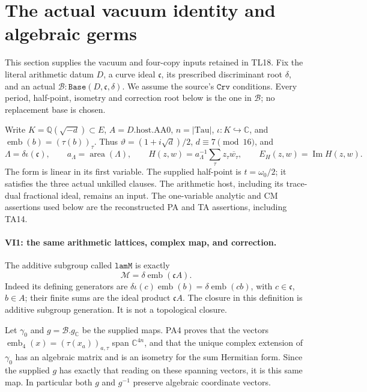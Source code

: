 \section{The actual vacuum identity and algebraic germs}
\label{sec:vacuum-identity}

This section supplies the vacuum and four-copy inputs retained in
TL18. Fix the literal arithmetic datum \(D\), a curve ideal
\(\mathfrak c\), its prescribed discriminant root \(\delta\), and
an actual \(\mathscr B:\texttt{Base}(D,\mathfrak c,\delta)\).
We assume the source's \(\texttt{Crv}\) conditions. Every period,
half-point, isometry and correction root below is the one in
\(\mathscr B\); no replacement base is chosen.

Write \(K=\mathbb Q(\sqrt{-d})\subset E\), \(A=D.\mathrm{host}.\mathrm{AA0}\),
\(n=|\mathrm{Tau}|\), \(\iota:K\hookrightarrow\mathbb C\), and
\(\operatorname{emb}(b)=(\tau(b))_\tau\). Thus
\(\vartheta=(1+i\sqrt d)/2\), \(d\equiv7\pmod {16}\), and
\[
 \Lambda=\delta\iota(\mathfrak c),\qquad
 a_\Lambda=\operatorname{area}(\Lambda),\qquad
 H(z,w)=a_\Lambda^{-1}\sum_\tau z_\tau\overline{w_\tau},
 \qquad E_H(z,w)=\operatorname{Im}H(z,w).
 \tag{VI.1}
\]
The form is linear in its first variable. The supplied half-point is
\(t=\omega_0/2\); it satisfies the three actual unkilled clauses.
The arithmetic host, including its trace-dual fractional ideal, remains
an input. The one-variable analytic and CM assertions used below are
the reconstructed PA and TA assertions, including TA14.

\paragraph{VI1: the same arithmetic lattices, complex map, and correction.}
The additive subgroup called \(\texttt{lamM}\) is exactly
\[
             \mathcal M=\delta\operatorname{emb}(\mathfrak c A).
 \tag{VI1.1}
\]
Indeed its defining generators are
\(\delta\iota(c)\operatorname{emb}(b)=
\delta\operatorname{emb}(cb)\), with \(c\in\mathfrak c\),
\(b\in A\); their finite sums are the ideal product
\(\mathfrak c A\). The closure in this definition is additive
subgroup generation. It is not a topological closure.

Let \(\gamma_0\) and \(g=\mathscr B.g_{\mathbb C}\) be the supplied
maps. PA4 proves that the vectors
\(\operatorname{emb}_4(x)=(\tau(x_a))_{a,\tau}\) span
\(\mathbb C^{4n}\), and that the unique complex extension of
\(\gamma_0\) has an algebraic matrix and is an isometry for the
sum Hermitian form. Since the supplied \(g\) has exactly that
reading on these spanning vectors, it is this same map. In particular
both \(g\) and \(g^{-1}\) preserve algebraic coordinate vectors.

